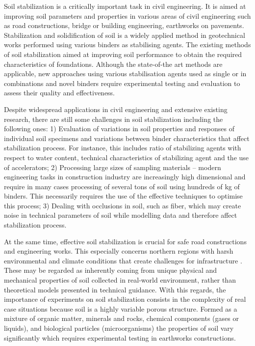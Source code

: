 \documentclass[eprint,
]{actapoly}
\begin{document}
Soil stabilization is a critically important task in civil engineering. It is aimed at improving soil parameters and properties in various areas of civil engineering such as road constructions, bridge or building engineering, earthworks on pavements. Stabilization and solidification of soil is a widely applied method in geotechnical works performed using various binders as stabilising agents. The existing methods of soil stabilization aimed at improving soil performance to obtain the required characteristics of foundations. Although the state-of-the art methods are applicable, new approaches using various stabilisation agents used as single or in combinations and novel binders require experimental testing and evaluation to assess their quality and effectiveness. 

Despite widespread applications in civil engineering and extensive existing research, there are still some challenges in soil stabilization including the following ones: 1) Evaluation of variations in soil properties and responses of individual soil specimens and variations between binder characteristics that affect stabilization process. For instance, this includes ratio of stabilizing agents with respect to water content, technical characteristics of stabilizing agent and the use of accelerators; 2) Processing large sizes of sampling materials – modern engineering tasks in construction industry are increasingly high dimensional and require in many cases processing of several tons of soil using hundreds of kg of binders. This necessarily requires the use of the effective techniques to optimise this process; 3) Dealing with occlusions in soil, such as fiber, which may create noise in technical parameters of soil while modelling data and therefore affect stabilization process. 

At the same time, effective soil stabilization is crucial for safe road constructions and engineering works. This especially concerns northern regions with harsh environmental and climate conditions that create challenges for infrastructure \citep{Dahlinetal1999,ROTHHAMEL2022100735,Lindh2004,VESTIN2018146,Lemenkov2021a,Lemenkov2021b,Eigenbrod}. These may be regarded as inherently coming from unique physical and mechanical properties of soil collected in real-world environment, rather than theoretical models presented in technical guidance. With this regards, the importance of experiments on soil stabilization consists in the complexity of real case situations because soil is a highly variable porous structure. Formed as a mixture of organic matter, minerals and rocks, chemical components (gases or liquids), and biological particles (microorganisms) the properties of soil vary significantly which requires experimental testing in earthworks constructions. 
\end{document}
